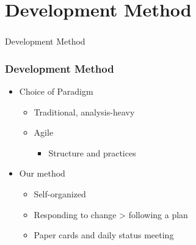 \section[Dev. Method]{Development Method}

\begin{frame}
  \frametitle{}
  \begin{center}
    {\Huge Development Method}
  \end{center}
\end{frame}

\begin{frame}
    \frametitle{Development Method}
    \begin{itemize}
			\item Choice of Paradigm
		  \begin{itemize}
				\item Traditional, analysis-heavy
				\item Agile
				\begin{itemize}
					\item Structure and practices
				\end{itemize}
			\end{itemize}
			\item Our method
			\begin{itemize}
				\item Self-organized
				\item Responding to change > following a plan
				\item Paper cards and daily status meeting
			\end{itemize}
		\end{itemize}
\end{frame}
